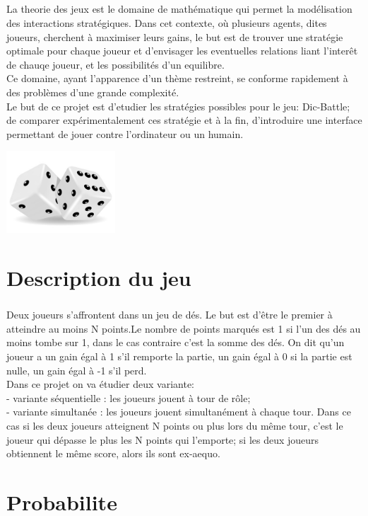 \documentclass{report}
\begin{document}
  \paragraph{}
  \begin{Large}
  La theorie des jeux est le domaine de mathématique qui permet la modélisation des interactions stratégiques. 
  Dans cet contexte, où plusieurs agents, dites joueurs, cherchent à maximiser leurs gains, le but est de trouver
  une stratégie optimale pour chaque joueur et d'envisager les eventuelles relations liant l'interêt de chauqe 
  joueur, et les possibilités d'un equilibre.\\
  Ce domaine, ayant l'apparence d'un thème restreint, se conforme rapidement à des problèmes d'une grande complexité.\\
  Le but de ce projet est d'etudier les stratégies possibles pour le jeu: Dic-Battle; de comparer expérimentalement ces stratégie
  et à la fin, d'introduire une interface permettant de jouer contre l'ordinateur ou un humain.\\[3.5cm]
  \end{Large}
  \begin{center}
    \includegraphics[width=11em]{de.jpg}\\[30cm]
  \end{center}


  \newpage
  \chapter{Description du jeu}
  \paragraph{}
  \begin{large}
  Deux joueurs s'affrontent dans un jeu de dés. Le but est d'être le premier à atteindre au moins
  N points.Le nombre de points marqués est 1 si l'un des dés au moins tombe sur 1,
  dans le cas contraire c'est la somme des dés. On dit qu'un joueur a un gain égal à 1 s'il remporte la partie, un gain égal
  à 0 si la partie est nulle, un gain égal à -1 s'il perd.\\
  Dans ce projet on va étudier deux variante:\\
  - variante séquentielle : les joueurs jouent à tour de rôle;\\
  - variante simultanée : les joueurs jouent simultanément à chaque tour. Dans ce cas si les
  deux joueurs atteignent N points ou plus lors du même tour, c'est le joueur qui dépasse le
  plus les N points qui l'emporte; si les deux joueurs obtiennent le même score, alors ils sont
  ex-aequo.
  \end{large}

  {\let\clearpage\relax \chapter{Probabilite}}   %
  

  
\end{document}
